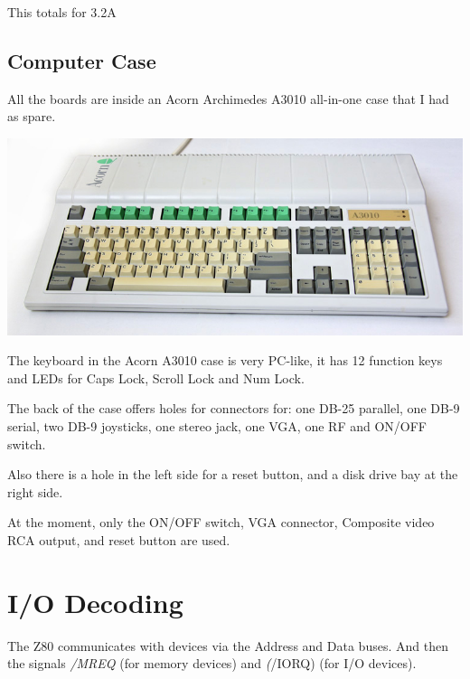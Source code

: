 \documentclass[a4paper,11pt]{article}
\begin{document}
    This totals for 3.2A

    \subsection{Computer Case}

    All the boards are inside an Acorn Archimedes A3010 all-in-one case that I
    had as spare.

    \begin{center}
        \includegraphics{acorn3010top.jpg}
    \end{center}

    The keyboard in the Acorn A3010 case is very PC-like, it has 12 function
    keys and LEDs for Caps Lock, Scroll Lock and Num Lock.

    The back of the case offers holes for connectors for: one DB-25 parallel, 
    one DB-9 serial, two DB-9 joysticks, one stereo jack, one VGA, one RF and
    ON/OFF switch.

    Also there is a hole in the left side for a reset button, and a disk drive
    bay at the right side.

    At the moment, only the ON/OFF switch, VGA connector, Composite video RCA
    output, and reset button are used.

    \pagebreak
    \section{I/O Decoding}

    The Z80 communicates with devices via the Address and Data buses. And then
    the signals \textit{/MREQ} (for memory devices) and \textit(/IORQ) (for I/O
    devices).
\end{document}
